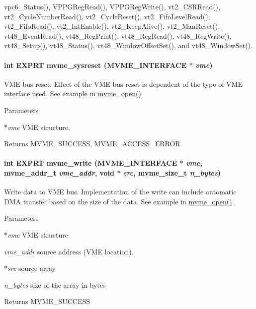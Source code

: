 vpc6\_\-Status(), VPPGRegRead(), VPPGRegWrite(), vt2\_\-CSRRead(), vt2\_\-CycleNumberRead(), vt2\_\-CycleReset(), vt2\_\-FifoLevelRead(), vt2\_\-FifoRead(), vt2\_\-IntEnable(), vt2\_\-KeepAlive(), vt2\_\-ManReset(), vt48\_\-EventRead(), vt48\_\-RegPrint(), vt48\_\-RegRead(), vt48\_\-RegWrite(), vt48\_\-Setup(), vt48\_\-Status(), vt48\_\-WindowOffsetSet(), and vt48\_\-WindowSet().
\paragraph[{mvme\_\-sysreset}]{\setlength{\rightskip}{0pt plus 5cm}int EXPRT mvme\_\-sysreset ({\bf MVME\_\-INTERFACE} $\ast$ {\em vme})}\hfill\label{group__mvmestdfunctionh_ga176cf77674a46bbef7ec446b4344bce2}
VME bus reset. Effect of the VME bus reset is dependent of the type of VME interface used. See example in \hyperlink{group__mvmestdfunctionh_ga13db7fc7c7c022e46fadd8fc4dc40047}{mvme\_\-open()} 
\begin{DoxyParams}{Parameters}
\item[{\em $\ast$vme}]VME structure. \end{DoxyParams}
\begin{DoxyReturn}{Returns}
MVME\_\-SUCCESS, MVME\_\-ACCESS\_\-ERROR 
\end{DoxyReturn}
\paragraph[{mvme\_\-write}]{\setlength{\rightskip}{0pt plus 5cm}int EXPRT mvme\_\-write ({\bf MVME\_\-INTERFACE} $\ast$ {\em vme}, \/  {\bf mvme\_\-addr\_\-t} {\em vme\_\-addr}, \/  void $\ast$ {\em src}, \/  {\bf mvme\_\-size\_\-t} {\em n\_\-bytes})}\hfill\label{group__mvmestdfunctionh_gab246e52895227ad3910ac7816801a73b}
Write data to VME bus. Implementation of the write can include automatic DMA transfer based on the size of the data. See example in \hyperlink{group__mvmestdfunctionh_ga13db7fc7c7c022e46fadd8fc4dc40047}{mvme\_\-open()} 
\begin{DoxyParams}{Parameters}
\item[{\em $\ast$vme}]VME structure \item[{\em vme\_\-addr}]source address (VME location). \item[{\em $\ast$src}]source array \item[{\em n\_\-bytes}]size of the array in bytes \end{DoxyParams}
\begin{DoxyReturn}{Returns}
MVME\_\-SUCCESS 
\end{DoxyReturn}
